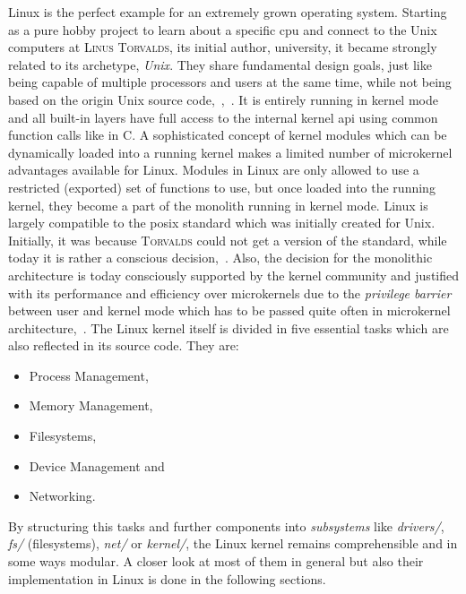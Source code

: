 Linux is the perfect example for an extremely grown operating system.
Starting as a pure hobby project to learn about a specific \ac{cpu} and connect to the Unix computers at \textsc{Linus Torvalds}, its initial author, university, it became strongly related to its archetype, \textit{Unix}\cite{DiamondTorvalds2002}. 
They share fundamental design goals, just like being capable of multiple processors and users at the same time, while not being based on the origin Unix source code\cite{tanenbaum-modern-operating-systems},~\cite{lfd430},~\cite{DiamondTorvalds2002}.
It is entirely running in kernel mode and all built-in layers have full access to the internal kernel \ac{api} using common function calls like in C.
A sophisticated concept of kernel modules which can be dynamically loaded into a running kernel makes a limited number of microkernel advantages available for Linux.
Modules in Linux are only allowed to use a restricted (exported) set of functions to use, but once loaded into the running kernel, they become a part of the monolith running in kernel mode\cite{lfd430}.
Linux is largely compatible to the \ac{posix} standard which was initially created for Unix.
Initially, it was because \textsc{Torvalds} could not get a version of the standard, while today it is rather a conscious decision\cite{DiamondTorvalds2002},~\cite{tanenbaum-modern-operating-systems}. 
Also, the decision for the monolithic architecture is today consciously supported by the kernel community and justified with its performance and efficiency over microkernels due to the \textit{privilege barrier} between user and kernel mode which has to be passed quite often in microkernel architecture\cite{why-linux-monolith},~\cite{lfd430}.
The Linux kernel itself is divided in five essential tasks which are also reflected in its source code.
They are: 
\begin{itemize}
    \item Process Management,
    \item Memory Management,
    \item Filesystems,
    \item Device Management and
    \item Networking\cite{lfd430}.
\end{itemize}
By structuring this tasks and further components into \textit{subsystems} like \textit{drivers/}, \textit{fs/} (filesystems), \textit{net/} or \textit{kernel/}, the Linux kernel remains comprehensible and in some ways modular. 
A closer look at most of them in general but also their implementation in Linux is done in the following sections.

